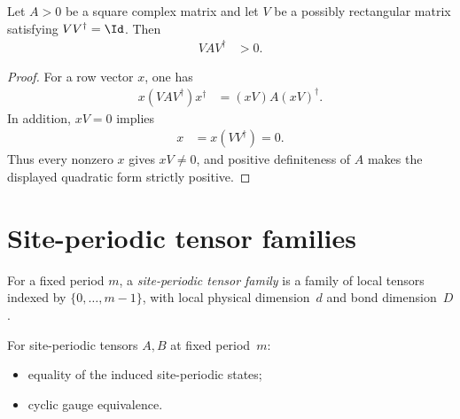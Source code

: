 \begin{lemma}
    \label{thm:matrix_posdef_coisometric_transport}
    \leanok
    Let $A>0$ be a square complex matrix and let $V$ be a possibly rectangular
    matrix satisfying $VV^\dagger=\Id$. Then
    \begin{align}
        VAV^\dagger & >0.
    \end{align}
\end{lemma}

\begin{proof}\leanok
    For a row vector $x$, one has
    \begin{align}
        x(VAV^\dagger)x^\dagger & =(xV)A(xV)^\dagger.
    \end{align}
    In addition, $xV=0$ implies
    \begin{align}
        x & =x(VV^\dagger)=0.
    \end{align}
    Thus every nonzero $x$ gives $xV\ne0$, and positive definiteness of $A$
    makes the displayed quadratic form strictly positive.
\end{proof}

\section{Site-periodic tensor families}

\begin{definition}\label{def:periodic_mps_tensor}
    \leanok
    For a fixed period $m$, a \emph{site-periodic tensor family} is a
    family of local tensors indexed by $\{0,\ldots,m{-}1\}$, with
    local physical dimension~$d$ and bond dimension~$D$.
\end{definition}

\begin{definition}\label{def:periodic_relations}
    \leanok
    For site-periodic tensors $A,B$ at fixed period~$m$:
    \begin{itemize}
        \item equality of the induced site-periodic states;
        \item cyclic gauge equivalence.
    \end{itemize}
\end{definition}

